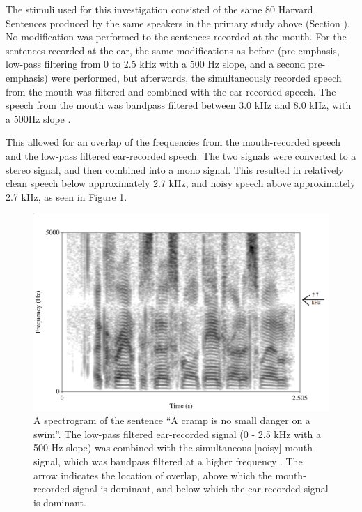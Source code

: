 The stimuli used for this investigation consisted of the same 80 Harvard Sentences produced by the same speakers in the primary study above (Section \DIFdelbegin \DIFdel{\ref{expt3}}\DIFdelend \DIFaddbegin \DIFadd{\ref{expt2}}\DIFaddend ).
No modification was performed to the sentences recorded at the mouth.  For the sentences recorded at the ear, the same modifications as before (pre-emphasis, low-pass filtering from 0 to 2.5 kHz with a 500 Hz slope, and a second pre-emphasis) were performed, but afterwards, the simultaneously recorded speech from the mouth was filtered and combined with the ear-recorded speech.  The speech from the mouth was bandpass filtered between 3.0 kHz and 8.0 kHz, with a 500Hz slope \DIFaddbegin {}\DIFaddend .  

This allowed for an overlap of the frequencies from the mouth-recorded speech and the low-pass filtered ear-recorded speech.  The two signals were converted to a stereo signal, and then combined into a mono signal.  This resulted in relatively clean speech below approximately 2.7 kHz, and noisy speech above approximately 2.7 kHz, as seen in Figure \ref{fig:combined-signal}.

\begin{figure}[h]
\centering
  \includegraphics[width=\textwidth]{figure/combined-signal_labeled.png}
  \caption{A spectrogram of the sentence ``A cramp is no small danger on a swim''.  The low-pass filtered ear-recorded signal (0 - 2.5 kHz with a 500 Hz slope) was combined with the simultaneous [noisy] mouth signal, which was bandpass filtered at a higher frequency \DIFaddbeginFL {}\DIFaddendFL .  The arrow indicates the location of overlap, above which the mouth-recorded signal is dominant, and below which the ear-recorded signal is dominant.}
  \label{fig:combined-signal}
\end{figure}
%

